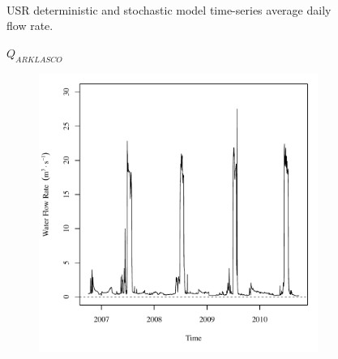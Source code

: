 \begin{landscape}
\begin{figure}
\begin{subfigure}{0.7\textwidth}
		\end{subfigure}\\
		\caption{USR deterministic and stochastic model time-series average daily flow rate.}
	\end{figure}
\end{landscape}



\subfiguretop
\begin{landscape}
	\begin{figure}
		\centering
		$ Q_{ARKLASCO} $
		\begin{subfigure}{0.7\textwidth}
			\centering
			\includegraphics[width=\tableCustomSize]{"Figures/Results_DSR/Deterministic/Q in"}
		\end{subfigure}%
		\begin{subfigure}{0.7\textwidth}
			\centering

\end{subfigure}
\end{figure}
\end{landscape}
